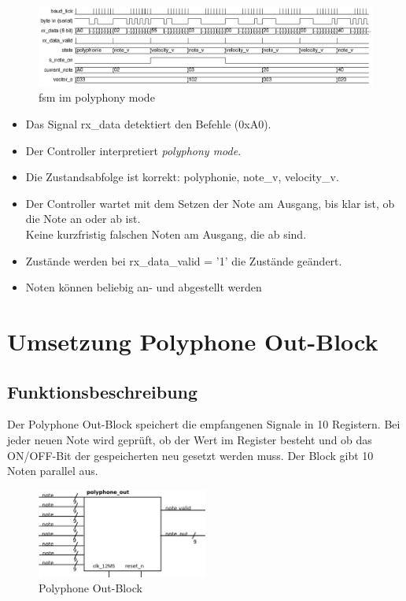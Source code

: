 \begin{figure}[H]
	\centering
	\includegraphics[width=1\textwidth]{images/midi_control/wave_polyphonie.png}
	\caption{fsm im polyphony mode}
	\label{fig.midicontrol_polyphonie}
\end{figure}


\begin{itemize}
	\item Das Signal rx\_data detektiert den Befehle (0xA0).
	\item Der Controller interpretiert  \textit{polyphony mode}. 
	\item Die Zustandsabfolge ist korrekt: polyphonie, note\_v, velocity\_v.
	\item Der Controller wartet mit dem Setzen der Note am Ausgang, bis klar ist, ob die Note an oder ab ist. \\
	Keine kurzfristig falschen Noten am Ausgang, die ab sind.
	\item Zustände werden bei rx\_data\_valid = '1' die Zustände geändert.
	\item Noten können beliebig an- und abgestellt werden
\end{itemize}


\section{Umsetzung Polyphone Out-Block}\label{sect.polyphonie_umsetzung}
 
\subsection{Funktionsbeschreibung}
Der Polyphone Out-Block speichert die empfangenen Signale in 10 Registern. Bei jeder neuen Note wird geprüft, ob der Wert im Register besteht und ob das ON/OFF-Bit der gespeicherten neu gesetzt werden muss. Der Block gibt 10 Noten parallel aus.\\

\begin{figure}[H]
	\centering
	\includegraphics[width=0.5\textwidth]{images/midi_interface/polyphonie_blockschaltbild.png}
	\caption{Polyphone Out-Block}
	\label{fig.polyphnie_out_block}
\end{figure}

